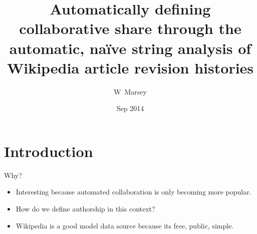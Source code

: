 \documentclass[t]{beamer}
\begin{document}
\title[Analysis of Wikipedia hitories] %
{Automatically defining collaborative share through
    the automatic, na\"ive string analysis of Wikipedia article
    revision histories}
\author %
{W~Marsey}
\date %
{Sep 2014}
\subject{Computing Science}

\frame{\titlepage}

\section{Introduction}

\begin{frame}{Why?}
  \begin{itemize}[<+->]
  \item Interesting because automated collaboration is only becoming
    more popular.
  \item How do we define authorship in this context?
  \item Wikipedia is a good model data source because its free,
    public, simple.
  \end{itemize} 
\end{frame}
\end{document}
